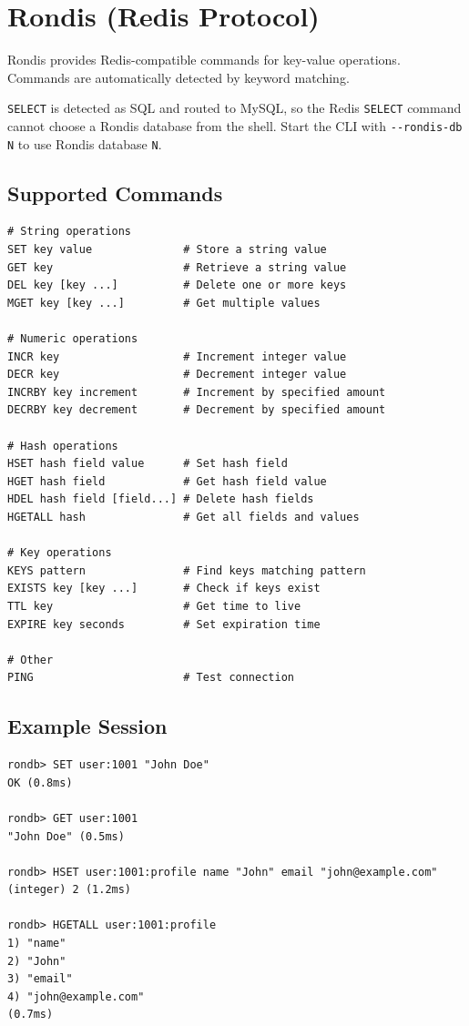 \documentclass[11pt,a4paper]{report}
\begin{document}
\section{Rondis (Redis Protocol)}

Rondis provides Redis-compatible commands for key-value operations. Commands are automatically detected by keyword matching.

\texttt{SELECT} is detected as SQL and routed to MySQL, so the Redis \texttt{SELECT} command cannot choose a Rondis database from the shell. Start the CLI with \texttt{-{}-rondis-db N} to use Rondis database \texttt{N}.

\subsection{Supported Commands}

\begin{lstlisting}[language=rondb]
# String operations
SET key value              # Store a string value
GET key                    # Retrieve a string value
DEL key [key ...]          # Delete one or more keys
MGET key [key ...]         # Get multiple values

# Numeric operations
INCR key                   # Increment integer value
DECR key                   # Decrement integer value
INCRBY key increment       # Increment by specified amount
DECRBY key decrement       # Decrement by specified amount

# Hash operations
HSET hash field value      # Set hash field
HGET hash field            # Get hash field value
HDEL hash field [field...] # Delete hash fields
HGETALL hash               # Get all fields and values

# Key operations
KEYS pattern               # Find keys matching pattern
EXISTS key [key ...]       # Check if keys exist
TTL key                    # Get time to live
EXPIRE key seconds         # Set expiration time

# Other
PING                       # Test connection
\end{lstlisting}

\subsection{Example Session}

\begin{lstlisting}[language=rondb]
rondb> SET user:1001 "John Doe"
OK (0.8ms)

rondb> GET user:1001
"John Doe" (0.5ms)

rondb> HSET user:1001:profile name "John" email "john@example.com"
(integer) 2 (1.2ms)

rondb> HGETALL user:1001:profile
1) "name"
2) "John"
3) "email"
4) "john@example.com"
(0.7ms)
\end{lstlisting}
\end{document}
